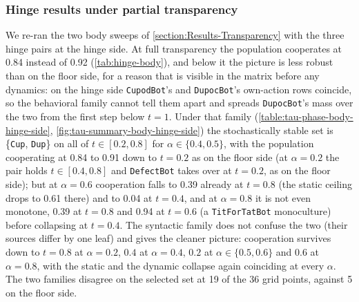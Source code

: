 \subsubsection{Hinge results under partial transparency}
\label{apx-subsubsection:Experiments-Transparency-Hinge}
We re-ran the two body sweeps of \cref{section:Results-Transparency} with the three hinge pairs at the hinge side. At full transparency the population cooperates at 0.84 instead of 0.92 (\cref{tab:hinge-body}), and below it the picture is less robust than on the floor side, for a reason that is visible in the matrix before any dynamics: on the hinge side \texttt{CupodBot}'s and \texttt{DupocBot}'s own-action rows coincide, so the behavioral family cannot tell them apart and spreads \texttt{DupocBot}'s mass over the two from the first step below $t = 1$. Under that family (\cref{table:tau-phase-body-hinge-side}, \cref{fig:tau-summary-body-hinge-side}) the stochastically stable set is \{\texttt{Cup}, \texttt{Dup}\} on all of $t \in [0.2, 0.8]$ for $\alpha \in \{0.4, 0.5\}$, with the population cooperating at 0.84 to 0.91 down to $t = 0.2$ as on the floor side (at $\alpha = 0.2$ the pair holds $t \in [0.4, 0.8]$ and \texttt{DefectBot} takes over at $t = 0.2$, as on the floor side); but at $\alpha = 0.6$ cooperation falls to 0.39 already at $t = 0.8$ (the static ceiling drops to 0.61 there) and to 0.04 at $t = 0.4$, and at $\alpha = 0.8$ it is not even monotone, 0.39 at $t = 0.8$ and 0.94 at $t = 0.6$ (a \texttt{TitForTatBot} monoculture) before collapsing at $t = 0.4$. The syntactic family does not confuse the two (their sources differ by one leaf) and gives the cleaner picture: cooperation survives down to $t = 0.8$ at $\alpha = 0.2$, $0.4$ at $\alpha = 0.4$, $0.2$ at $\alpha \in \{0.5, 0.6\}$ and $0.6$ at $\alpha = 0.8$, with the static and the dynamic collapse again coinciding at every $\alpha$. The two families disagree on the selected set at 19 of the 36 grid points, against 5 on the floor side.

